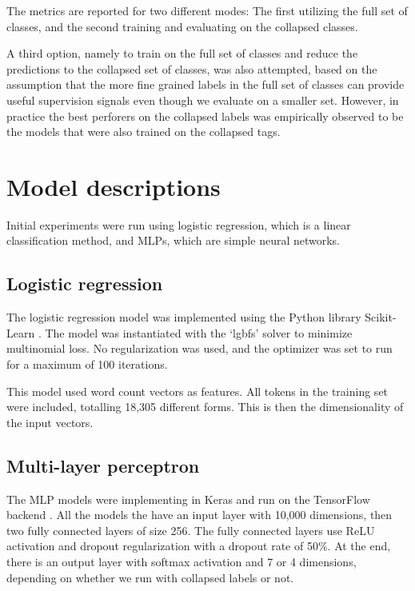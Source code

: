 The metrics are reported for two different modes: The first utilizing the
full set of classes, and the second training and evaluating on the collapsed
classes.

A third option, namely to train on the full set of classes and reduce the
predictions to the collapsed set of classes, was also attempted, based on the
assumption that the more fine grained labels in the full set of classes can
provide useful supervision signals even though we evaluate on a smaller set.
However, in practice the best perforers on the collapsed labels was
empirically observed to be the models that were also trained on the collapsed
tags.


\section{Model descriptions}

Initial experiments were run using logistic regression, which is a linear
classification method, and \acp{MLP}, which are simple neural networks.


\subsection{Logistic regression}

The logistic regression model was implemented using the Python library
Scikit-Learn \autocite{scikit-learn}. The model was instantiated with the
`lgbfs' solver to minimize multinomial loss. No regularization was used, and
the optimizer was set to run for a maximum of 100 iterations.

This model used word count vectors as features. All tokens in the training set
were included, totalling 18,305 different forms. This is then the dimensionality
of the input vectors.


\subsection{Multi-layer perceptron}
\label{subsec:mlp}

The MLP models were implementing in Keras \autocite{keras} and run on the
TensorFlow backend \autocite{tensorflow}. All the models the have an input
layer with 10,000 dimensions, then two fully connected layers of size 256.
The fully connected layers use \ac{ReLU} activation and dropout
regularization with a dropout rate of 50\%. At the end, there is an output
layer with softmax activation and 7 or 4 dimensions, depending on whether we
run with collapsed labels or not.

